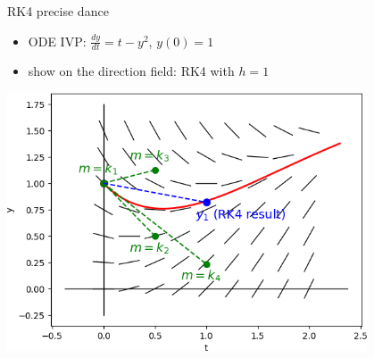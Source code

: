 \documentclass[urlcolor=blue,dvipsnames]{beamer}
\begin{document}
\begin{frame}{RK4 \alert{precise} dance}

\begin{itemize}
\item ODE IVP: $\frac{dy}{dt} = t-y^2$, $y(0)=1$
\item show on the direction field: RK4 with $h=1$
\end{itemize}

\hfill \includegraphics[width=0.8\textwidth]{figs/result-rk4-dir-field}
\end{frame}
\end{document}
